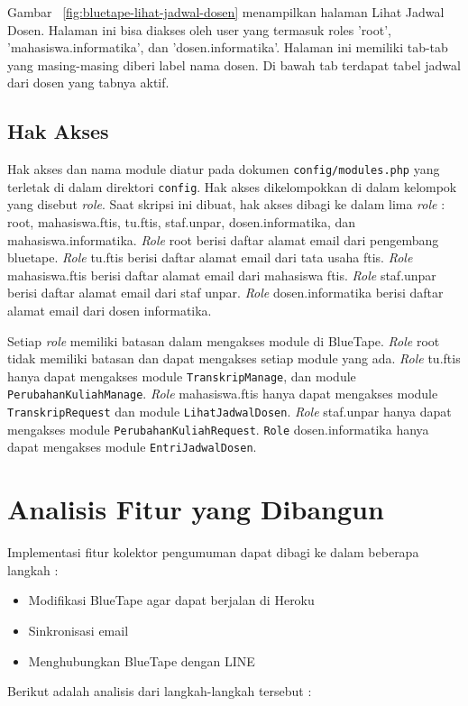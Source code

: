 	Gambar~ \ref{fig:bluetape-lihat-jadwal-dosen} menampilkan halaman Lihat Jadwal Dosen. Halaman ini bisa diakses oleh user yang termasuk roles 'root', 'mahasiswa.informatika', dan 'dosen.informatika'. Halaman ini memiliki tab-tab yang masing-masing diberi label nama dosen. Di bawah tab terdapat tabel jadwal dari dosen yang tabnya aktif.

\subsection{Hak Akses}
	Hak akses dan nama module diatur pada dokumen \texttt{config/modules.php} yang terletak di dalam direktori \texttt{config}. Hak akses dikelompokkan di dalam kelompok yang disebut \textit{role}. Saat skripsi ini dibuat, hak akses dibagi ke dalam lima \textit{role} : root, mahasiswa.ftis, tu.ftis, staf.unpar, dosen.informatika, dan mahasiswa.informatika. \textit{Role} root berisi daftar alamat email dari pengembang bluetape. \textit{Role} tu.ftis berisi daftar alamat email dari tata usaha ftis. \textit{Role} mahasiswa.ftis berisi daftar alamat email dari mahasiswa ftis. \textit{Role} staf.unpar berisi daftar alamat email dari staf unpar. \textit{Role} dosen.informatika berisi daftar alamat email dari dosen informatika.

	Setiap \textit{role} memiliki batasan dalam mengakses module di BlueTape. \textit{Role} root tidak memiliki batasan dan dapat mengakses setiap module yang ada. \textit{Role} tu.ftis hanya dapat mengakses module \texttt{TranskripManage}, dan module \texttt{PerubahanKuliahManage}. \textit{Role} mahasiswa.ftis hanya dapat mengakses module \texttt{TranskripRequest} dan module \texttt{LihatJadwalDosen}. \textit{Role} staf.unpar hanya dapat mengakses module \texttt{PerubahanKuliahRequest}. \texttt{Role} dosen.informatika hanya dapat mengakses module \texttt{EntriJadwalDosen}.

\section{Analisis Fitur yang Dibangun}
\label{sec:analisisYangDibangun}
	Implementasi fitur kolektor pengumuman dapat dibagi ke dalam beberapa langkah :
\begin{itemize}
	\item Modifikasi BlueTape agar dapat berjalan di Heroku
	\item Sinkronisasi email
	\item Menghubungkan BlueTape dengan LINE
\end{itemize}
	Berikut adalah analisis dari langkah-langkah tersebut :
